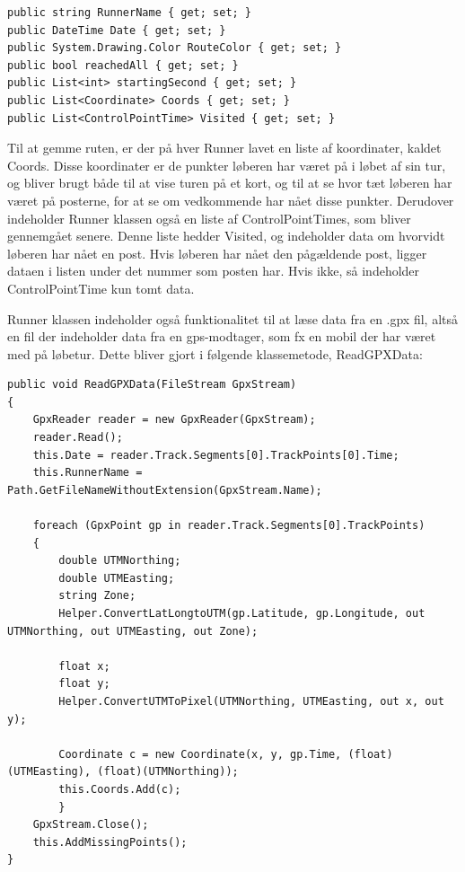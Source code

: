 \begin{lstlisting}
public string RunnerName { get; set; }
public DateTime Date { get; set; }
public System.Drawing.Color RouteColor { get; set; }
public bool reachedAll { get; set; }
public List<int> startingSecond { get; set; }
public List<Coordinate> Coords { get; set; }
public List<ControlPointTime> Visited { get; set; }
\end{lstlisting}

Til at gemme ruten, er der på hver Runner lavet en liste af koordinater, kaldet Coords.
Disse koordinater er de punkter løberen har været på i løbet af sin tur, og bliver brugt både til at vise turen på et kort, og til at se hvor tæt løberen har været på posterne, for at se om vedkommende har nået disse punkter.
Derudover indeholder Runner klassen også en liste af ControlPointTimes, som bliver gennemgået senere. Denne liste hedder Visited, og indeholder data om hvorvidt løberen har nået en post. Hvis løberen har nået den pågældende post, ligger dataen i listen under det nummer som posten har. Hvis ikke, så indeholder ControlPointTime kun tomt data. 
 

Runner klassen indeholder også funktionalitet til at læse data fra en .gpx fil, altså en fil der indeholder data fra en gps-modtager, som fx en mobil der har været med på løbetur.
Dette bliver gjort i følgende klassemetode, ReadGPXData:


\begin{lstlisting}
public void ReadGPXData(FileStream GpxStream)
{
	GpxReader reader = new GpxReader(GpxStream);
	reader.Read();
	this.Date = reader.Track.Segments[0].TrackPoints[0].Time;
	this.RunnerName = Path.GetFileNameWithoutExtension(GpxStream.Name);

	foreach (GpxPoint gp in reader.Track.Segments[0].TrackPoints)
	{
		double UTMNorthing;
		double UTMEasting;
		string Zone;
        Helper.ConvertLatLongtoUTM(gp.Latitude, gp.Longitude, out UTMNorthing, out UTMEasting, out Zone);

        float x;
        float y;
        Helper.ConvertUTMToPixel(UTMNorthing, UTMEasting, out x, out y);

        Coordinate c = new Coordinate(x, y, gp.Time, (float)(UTMEasting), (float)(UTMNorthing));
        this.Coords.Add(c);
        }
    GpxStream.Close();
    this.AddMissingPoints();
}
\end{lstlisting}

